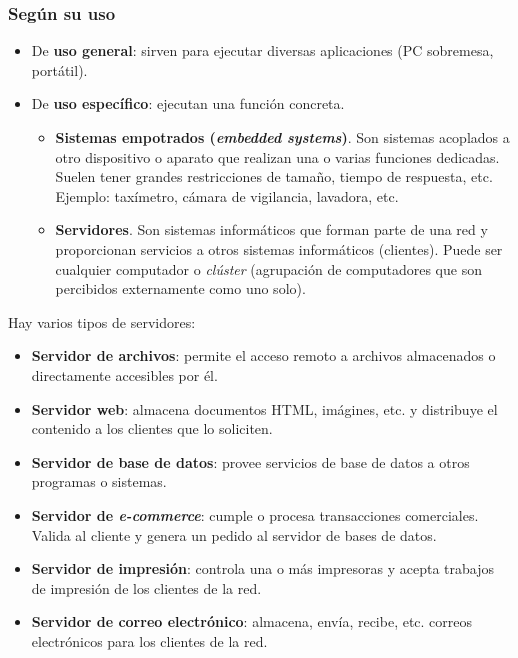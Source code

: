 \documentclass[12pt,spanish]{article}
\begin{document}
\subsubsection{Según su uso}

\begin{itemize}
	\item De \textbf{uso general}: sirven para ejecutar diversas aplicaciones (PC sobremesa, portátil).
	\item De \textbf{uso específico}: ejecutan una función concreta.
	\begin{itemize}
		\item \textbf{Sistemas empotrados (\textit{embedded systems})}. Son sistemas acoplados a otro dispositivo o aparato que realizan una o varias funciones dedicadas. Suelen tener grandes restricciones de tamaño, tiempo de respuesta, etc. Ejemplo: taxímetro, cámara de vigilancia, lavadora, etc.
		\item \textbf{Servidores}. Son sistemas informáticos que forman parte de una red y proporcionan servicios a otros sistemas informáticos (clientes). Puede ser cualquier computador o \textit{clúster} (agrupación de computadores que son percibidos externamente como uno solo).
	\end{itemize}
\end{itemize}

Hay varios tipos de servidores:
\begin{itemize}
	\item \textbf{Servidor de archivos}: permite el acceso remoto a archivos almacenados o directamente accesibles por él.
	\item \textbf{Servidor web}: almacena documentos HTML, imágines, etc. y distribuye el contenido a los clientes que lo soliciten.
	\item \textbf{Servidor de base de datos}: provee servicios de base de datos a otros programas o sistemas.
	\item \textbf{Servidor de \textit{e-commerce}}: cumple o procesa transacciones comerciales. Valida al cliente y genera un pedido al servidor de bases de datos.
	\item \textbf{Servidor de impresión}: controla una o más impresoras y acepta trabajos de impresión de los clientes de la red.
	\item \textbf{Servidor de correo electrónico}: almacena, envía, recibe, etc. correos electrónicos para los clientes de la red.
\end{itemize}
\end{document}
